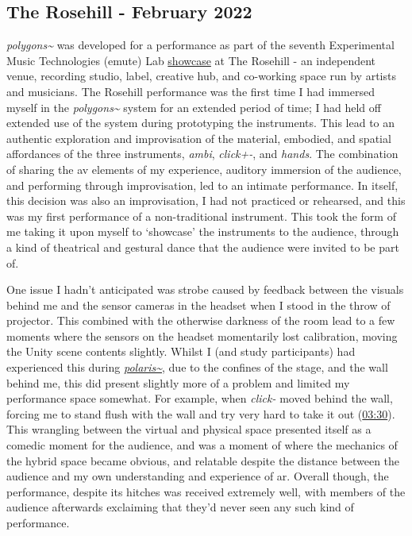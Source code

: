 \subsection{The Rosehill - February 2022}\label{sec: polygons-performances-rosehill}
\textit{polygons\textasciitilde{}} was developed for a performance as part of the seventh Experimental Music Technologies (emute) Lab \href{http://www.emutelab.org/blog/emutelab6}{showcase} at The Rosehill - an independent venue, recording studio, label, creative hub, and co-working space run by artists and musicians. The Rosehill performance was the first time I had immersed myself in the \textit{polygons\textasciitilde{}} system for an extended period of time; I had held off extended use of the system during prototyping the instruments. This lead to an authentic exploration and improvisation of the material, embodied, and spatial affordances of the three instruments, \textit{ambi}, \textit{click+-}, and \textit{hands}. The combination of sharing the \gls{av} elements of my experience, auditory immersion of the audience, and performing through improvisation, led to an intimate performance. In itself, this decision was also an improvisation, I had not practiced or rehearsed, and this was my first performance of a non-traditional instrument. This took the form of me taking it upon myself to `showcase' the instruments to the audience, through a kind of theatrical and gestural dance that the audience were invited to be part of. 

One issue I hadn't anticipated was strobe caused by feedback between the visuals behind me and the sensor cameras in the headset when I stood in the throw of projector. This combined with the otherwise darkness of the room lead to a few moments where the sensors on the headset momentarily lost calibration, moving the Unity scene contents slightly. Whilst I (and study participants) had experienced this during \hyperref[sec: polaris-feedback-adoption-alignment]{\textit{polaris\textasciitilde{}}}, due to the confines of the stage, and the wall behind me, this did present slightly more of a problem and limited my performance space somewhat. For example, when \textit{click-} moved behind the wall, forcing me to stand flush with the wall and try very hard to take it out (\href{https://youtu.be/9IErsDvhXjM?t=210}{03:30}). This wrangling between the virtual and physical space presented itself as a comedic moment for the audience, and was a moment of where the mechanics of the hybrid space became obvious, and relatable despite the distance between the audience and my own understanding and experience of \gls{ar}. Overall though, the performance, despite its hitches was received extremely well, with members of the audience afterwards exclaiming that they'd never seen any such kind of performance. 

